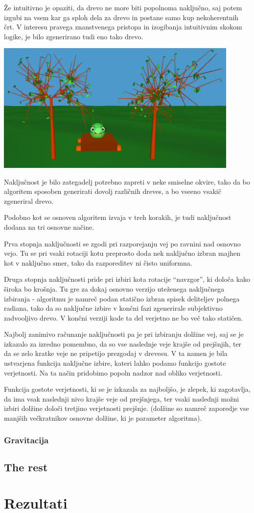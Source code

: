 \documentclass[10pt,a4paper,oneside]{book}
\begin{document}
Že intuitivno je opaziti, da drevo ne more biti popolnoma naključno,
saj potem izgubi na vsem kar ga sploh dela za drevo in postane samo
kup nekoherentnih črt. V interesu pravega znanstvenega pristopa in
izogibanja intuitivnim skokom logike, je bilo zgenerirano tudi eno
tako drevo.

\includegraphics[width=12cm]{randomtree.png}

Naključnost je bilo zategadelj potrebno zapreti v neke smiselne
okvire, tako da bo algoritem sposoben generirati dovolj različnih
dreves, a bo vseeno vsakič zgeneriral drevo.

Podobno kot se osnoven algoritem izvaja v treh korakih, je tudi
naključnost dodana na tri osnovne načine.

Prva stopnja naključnosti se zgodi pri razporejanju vej po ravnini nad
osnovno vejo. Tu se pri vsaki rotaciji kotu preprosto doda nek
naključno izbran majhen kot v naključno smer, tako da razporeditev ni
čisto uniformna.

Druga stopnja naključnosti pride pri izbiri kota rotacije ``navzgor'',
ki določa kako široka bo krošnja. Tu gre za dokaj osnovno verzijo
uteženega naključnega izbiranja - algoritmu je namreč podan statično
izbran spisek deliteljev polnega radiana, tako da so naključne izbire
v končni fazi zgenerirale subjektivno zadvooljivo drevo. V končni
verziji kode ta del verjetno ne bo več tako statičen.

Najbolj zanimivo računanje naključnosti pa je pri izbiranju dolžine
vej, saj se je izkazalo za izredno pomembno, da so vse naslednje veje
krajše od prejšnjih, ter da se zelo kratke veje ne pripetijo prezgodaj
v drevesu. V ta namen je bila ustvarjena funkcija naključne izbire,
kateri lahko podamo funkcijo gostote verjetnosti. Na ta način
pridobimo popoln nadzor nad obliko verjetnosti.

Funkcija gostote verjetnosti, ki se je izkazala za najboljšo, je
zlepek, ki zagotavlja, da ima vsak naslednji nivo krajše veje od
prejšnjega, ter vsaki naslednji možni izbiri dolžine določi tretjino
verjetnosti prejšnje. (dolžine so namreč zaporedje vse manjših
večkratnikov osnovne dolžine, ki je parameter algoritma).

\subsection{Gravitacija}

\section{The rest}

\chapter{Rezultati}
\end{document}
